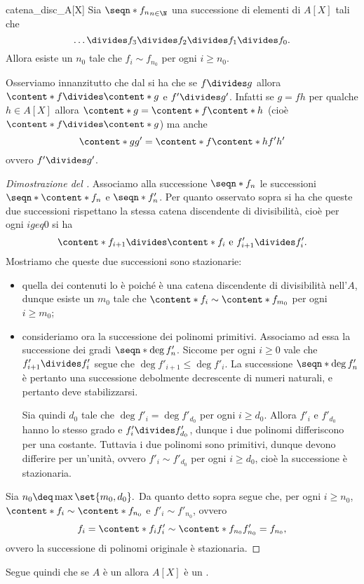 \begin{theorem}{}{catena_disc_A[X]}
    Sia $\seqn*{f_n}_{n \in \N}$ una successione di elementi di $A[X]$ tali che \[
        \dots \divides f_3 \divides f_2 \divides f_1 \divides f_0.
    \] Allora esiste un $n_0$ tale che $f_i \sim f_{n_0}$ per ogni $i \geq n_0$.
\end{theorem}

Osserviamo innanzitutto che dal  si ha che se $f \divides g$ allora $\content*{f} \divides \content*{g}$ e $f' \divides g'$. Infatti se $g = fh$ per qualche $h \in A[X]$ allora $\content*{g} = \content*{f}\content*{h}$ (cioè $\content*{f} \divides \content*{g}$) ma anche \[
    \content*{g}g' = \content*{f}\content*{h}f'h'
\] ovvero $f' \divides g'$.

\begin{proof}
    [Dimostrazione del ]
    Associamo alla successione $\seqn*{f_n}$ le successioni $\seqn*{\content*{f_n}}$ e $\seqn*{f'_n}$. Per quanto osservato sopra si ha che queste due successioni rispettano la stessa catena discendente di divisibilità, cioè per ogni $i geq 0$ si ha \[
        \content*{f_{i+1}} \divides \content*{f_i} \text{ e } f'_{i+1} \divides f'_i.
    \] Mostriamo che queste due successioni sono stazionarie:
    \begin{itemize}
        \item quella dei contenuti lo è poiché è una catena discendente di divisibilità nell'\UFD $A$, dunque esiste un $m_0$ tale che $\content*{f_i} \sim \content*{f_{m_0}}$ per ogni $i \geq m_0$;
        \item consideriamo ora la successione dei polinomi primitivi. Associamo ad essa la successione dei gradi $\seqn*{\deg f'_n}$. Siccome per ogni $i \geq 0$ vale che $f'_{i+1} \divides f'_i$ segue che $\deg f'_{i+1} \leq \deg f'_i$. La successione $\seqn*{\deg f'_n}$ è pertanto una successione debolmente decrescente di numeri naturali, e pertanto deve stabilizzarsi.
        
        Sia quindi $d_0$ tale che $\deg f'_i = \deg f'_{d_0}$ per ogni $i \geq d_0$. Allora $f'_i$ e $f'_{d_0}$ hanno lo stesso grado e $f'_i \divides f'_{d_0}$, dunque i due polinomi differiscono per una costante. Tuttavia i due polinomi sono primitivi, dunque devono differire per un'unità, ovvero $f'_i \sim f'_{d_0}$ per ogni $i \geq d_0$, cioè la successione è stazionaria. 
    \end{itemize}

    Sia $n_0 \deq \max\set{m_0, d_0}.$ Da quanto detto sopra segue che, per ogni $i \geq n_0$, $\content*{f_i} \sim \content*{f_{n_0}}$ e $f'_i \sim f'_{n_0}$, ovvero \[
        f_i = \content*{f_i}f'_i \sim \content*{f_{n_0}}f'_{n_0} = f_{n_0},
    \] ovvero la successione di polinomi originale è stazionaria.
\end{proof}

Segue quindi che se $A$ è un \UFD allora $A[X]$ è un \UFD. 